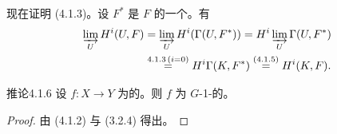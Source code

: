 现在证明 (4.1.3)。设 $F^*$ 是 $F$ 的一个。有
\[
\begin{aligned}
\varinjlim_U H^i(U,F)
&=\varinjlim_U H^i(\Gamma(U,F^*))
 =H^i\varinjlim_U\Gamma(U,F^*)\\
&\overset{4.1.3\,(i=0)}{=}H^i\Gamma(K,F^*)
 \overset{(4.1.5)}{=}H^i(K,F).
\end{aligned}
\]
\begin{SGAresult}{推论}{4.1.6}
设 $f:X\to Y$ 为的。则 $f$ 为 $G$-1-的。
\end{SGAresult}
\begin{proof}由 (4.1.2) 与 (3.2.4) 得出。\end{proof}

